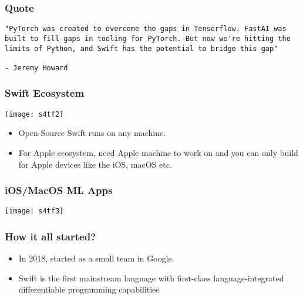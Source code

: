 \begin{frame}[fragile]\frametitle{Quote}
\begin{lstlisting}
"PyTorch was created to overcome the gaps in Tensorflow. FastAI was built to fill gaps in tooling for PyTorch. But now we're hitting the limits of Python, and Swift has the potential to bridge this gap"

- Jeremy Howard
\end{lstlisting}
\end{frame}


\begin{frame} \frametitle{Swift Ecosystem}
\begin{center}
\texttt{[image: s4tf2]}
\end{center}

\begin{itemize}
\item Open-Source Swift runs on any machine.
\item For Apple ecosystem, need Apple machine to work on and you can only build for Apple devices like the iOS, macOS etc.
\end{itemize}

\end{frame}

\begin{frame} \frametitle{iOS/MacOS ML Apps}
\begin{center}
\texttt{[image: s4tf3]}
\end{center}
\end{frame}

\begin{frame}[fragile] \frametitle{How it all started?}

\begin{itemize}
\item In 2018, started as a small team in Google.
\item Swift is the first mainstream language with first-class language-integrated differentiable programming capabilities
\end{itemize}

\end{frame}

